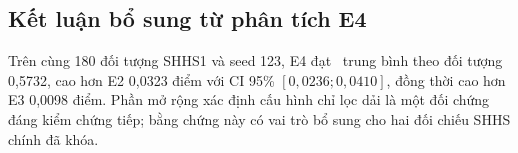 \subsection{Kết luận bổ sung từ phân tích E4}

Trên cùng 180 đối tượng SHHS1 và seed 123, E4 đạt \mf\ trung bình theo đối tượng 0,5732, cao hơn E2 0,0323 điểm với CI 95\% $[0,0236;0,0410]$, đồng thời cao hơn E3 0,0098 điểm. Phần mở rộng xác định cấu hình chỉ lọc dải là một đối chứng đáng kiểm chứng tiếp; bằng chứng này có vai trò bổ sung cho hai đối chiếu SHHS chính đã khóa.
